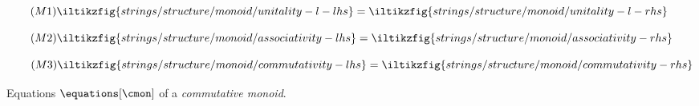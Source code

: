 \begin{figure}
    \centering
    \begin{minipage}{0.21\textwidth}
        \begin{equation}
            \tag{\(\mathsf{M1}\)}
            \iltikzfig{strings/structure/monoid/unitality-l-lhs}
            =
            \iltikzfig{strings/structure/monoid/unitality-l-rhs}
            \label{eq:monoid-unitality-l}
        \end{equation}
    \end{minipage}
    \begin{minipage}{0.26\textwidth}
        \begin{equation}
            \tag{\(\mathsf{M2}\)}
            \iltikzfig{strings/structure/monoid/associativity-lhs}
            =
            \iltikzfig{strings/structure/monoid/associativity-rhs}
            \label{eq:monoid-associativity}
        \end{equation}
    \end{minipage}
    \begin{minipage}{0.26\textwidth}
        \begin{equation}
            \tag{\(\mathsf{M3}\)}
            \iltikzfig{strings/structure/monoid/commutativity-lhs}
            =
            \iltikzfig{strings/structure/monoid/commutativity-rhs}
            \label{eq:monoid-commutativity}
        \end{equation}
    \end{minipage}
    \caption{Equations \(\equations[\cmon]\) of a \emph{commutative monoid}.}
    \label{fig:monoid-equations}
\end{figure}